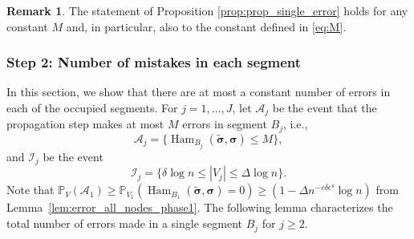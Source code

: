 \documentclass[letterpaper,11pt]{article}
\theoremstyle{definition}
\newtheorem{rem}{Remark}[section]
\def\P{\mathbb{P}}
\newcommand{\bsigma}{\bm{\sigma}}
\newcommand{\tbsigma}{\tilde{\bsigma}}
\def\cA{\mathcal{A}}
\def\cI{\mathcal{I}}
\numberwithin{equation}{section}
\newcommand{\de}{\delta}
\newcommand{\eps}{\epsilon}
\newcommand{\Ham}{\operatorname{Ham}}
\theoremstyle{definition}
\newtheorem{rem}{Remark}[section]
\def\P{\mathbb{P}}
\newcommand{\bsigma}{\bm{\sigma}}
\newcommand{\tbsigma}{\tilde{\bsigma}}
\def\cA{\mathcal{A}}
\def\cI{\mathcal{I}}
\numberwithin{equation}{section}
\newcommand{\de}{\delta}
\newcommand{\eps}{\epsilon}
\newcommand{\Ham}{\operatorname{Ham}}
\theoremstyle{thmstyletwo}%
\begin{document}
\begin{rem}
    The statement of Proposition \ref{prop:prop_single_error} holds for any constant $M$ and, in particular, also to the constant  defined in \eqref{eq:M}.
\end{rem}

\subsubsection{Step 2: Number of mistakes in each segment}
In this section, we show that there are at most a constant number of errors in each of the occupied segments.
For $j=1,\dots,J$, let $\cA_j$ be the event that the propagation step makes at most $M$ errors in segment $B_j$, i.e.,
\begin{equation}
\label{event:M_errors}
\cA_j 
= \{\Ham_{B_j}(\tbsigma,\bsigma) \le M\},
\end{equation}
and $\cI_j$ be the event 
\begin{equation}
\cI_j 
= \{\delta \log n \le |V_{j}| \le \Delta \log n\}.
\label{eq:Ij_event}
\end{equation}
 Note that $\P_V(\cA_1) \ge \P_{V_1} \left(
\Ham_{B_1}(\tbsigma, \bsigma)=0\right) \ge (1-\Delta n^{-c\de \eps^4} \log n)$ from Lemma~\ref{lem:error_all_nodes_phase1}. The following lemma characterizes the total number of errors made in a single segment $B_j$ for $j\ge 2$.
\end{document}
